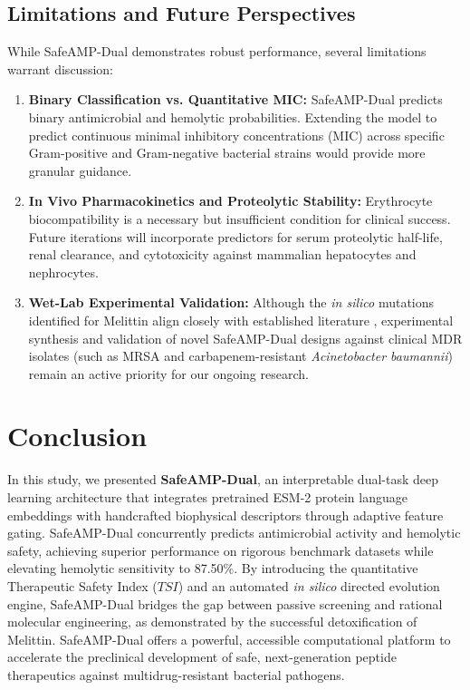 \documentclass[11pt,a4paper]{article}
\begin{document}
\subsection{Limitations and Future Perspectives}
While SafeAMP-Dual demonstrates robust performance, several limitations warrant discussion:
\begin{enumerate}
    \item \textbf{Binary Classification vs. Quantitative MIC:} SafeAMP-Dual predicts binary antimicrobial and hemolytic probabilities. Extending the model to predict continuous minimal inhibitory concentrations (MIC) across specific Gram-positive and Gram-negative bacterial strains would provide more granular guidance.
    \item \textbf{In Vivo Pharmacokinetics and Proteolytic Stability:} Erythrocyte biocompatibility is a necessary but insufficient condition for clinical success. Future iterations will incorporate predictors for serum proteolytic half-life, renal clearance, and cytotoxicity against mammalian hepatocytes and nephrocytes.
    \item \textbf{Wet-Lab Experimental Validation:} Although the \textit{in silico} mutations identified for Melittin align closely with established literature \cite{blondelle1991hemolytic, oren1997selective}, experimental synthesis and validation of novel SafeAMP-Dual designs against clinical MDR isolates (such as MRSA and carbapenem-resistant \textit{Acinetobacter baumannii}) remain an active priority for our ongoing research.
\end{enumerate}

\section{Conclusion}
In this study, we presented \textbf{SafeAMP-Dual}, an interpretable dual-task deep learning architecture that integrates pretrained ESM-2 protein language embeddings with handcrafted biophysical descriptors through adaptive feature gating. SafeAMP-Dual concurrently predicts antimicrobial activity and hemolytic safety, achieving superior performance on rigorous benchmark datasets while elevating hemolytic sensitivity to 87.50\%. By introducing the quantitative Therapeutic Safety Index ($TSI$) and an automated \textit{in silico} directed evolution engine, SafeAMP-Dual bridges the gap between passive screening and rational molecular engineering, as demonstrated by the successful detoxification of Melittin. SafeAMP-Dual offers a powerful, accessible computational platform to accelerate the preclinical development of safe, next-generation peptide therapeutics against multidrug-resistant bacterial pathogens.
\end{document}
